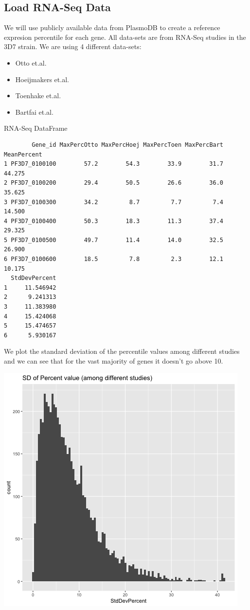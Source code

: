 \documentclass[11pt]{article}
\begin{document}
\subsection{Load RNA-Seq Data}
\label{sec:org6c5afe8}
We will use publicly available data from PlasmoDB to create a reference expresion percentile for each gene.
All data-sets are from RNA-Seq studies in the 3D7 strain.
We are using 4 different data-sets:
\begin{itemize}
\item Otto et.al.
\item Hoeijmakers et.al.
\item Toenhake et.al.
\item Bartfai et.al.
\end{itemize}

RNA-Seq DataFrame
\begin{verbatim}
        Gene_id MaxPercOtto MaxPercHoej MaxPercToen MaxPercBart MeanPercent
1 PF3D7_0100100        57.2        54.3        33.9        31.7      44.275
2 PF3D7_0100200        29.4        50.5        26.6        36.0      35.625
3 PF3D7_0100300        34.2         8.7         7.7         7.4      14.500
4 PF3D7_0100400        50.3        18.3        11.3        37.4      29.325
5 PF3D7_0100500        49.7        11.4        14.0        32.5      26.900
6 PF3D7_0100600        18.5         7.8         2.3        12.1      10.175
  StdDevPercent
1     11.546942
2      9.241313
3     11.383980
4     15.424068
5     15.474657
6      5.930167
\end{verbatim}

We plot the standard deviation of the percentile values among different studies and we can see that for the vast majority of genes it doesn't go above 10.
\begin{center}
\includegraphics[width=.9\linewidth]{./Plots/rnaseq_perc_sd.png}
\end{center}
\end{document}
